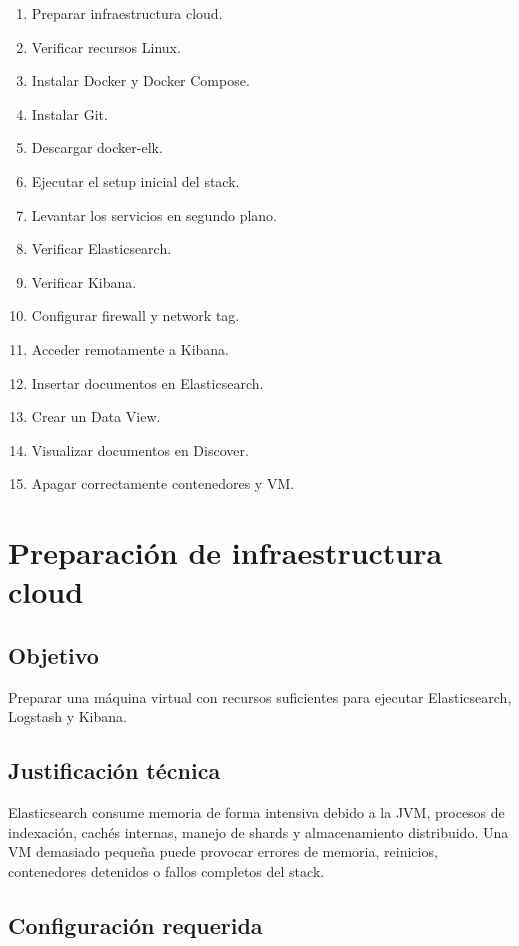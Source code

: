 \documentclass[
  coursetitle={Cómputo Nube y Tecnologías Emergentes},
  coursehours={96},
  coursedate={Verano 2026},
  doctype={Laboratorio},
  otherlangs={english,french},
  authorname={Lázaro},
  authorsurname={Bustio-Martínez},
  authortitle={PhD},
  role={Profesor Investigador},
  email={lbustio@inaoe.mx},
  phone={5559504000},
  ext={7459},
  institution={Instituto Nacional de Astrofísica, Óptica y Electrónica (INAOE)},
  department={Maestría en Ciencias en Tecnologías de Seguridad},
  address={Luis Enrique Erro 1, Sta. Ma. Tonantzintla, San Andrés Cholula, CP 72840, Puebla, México},
  margin={0.5in}
]{../../lbustio_lecture_notes}
\begin{document}
\begin{enumerate}
    \item Preparar infraestructura cloud.
    \item Verificar recursos Linux.
    \item Instalar Docker y Docker Compose.
    \item Instalar Git.
    \item Descargar docker-elk.
    \item Ejecutar el setup inicial del stack.
    \item Levantar los servicios en segundo plano.
    \item Verificar Elasticsearch.
    \item Verificar Kibana.
    \item Configurar firewall y network tag.
    \item Acceder remotamente a Kibana.
    \item Insertar documentos en Elasticsearch.
    \item Crear un Data View.
    \item Visualizar documentos en Discover.
    \item Apagar correctamente contenedores y VM.
\end{enumerate}

\section{Preparación de infraestructura cloud}

\subsection{Objetivo}

Preparar una máquina virtual con recursos suficientes para ejecutar Elasticsearch, Logstash y Kibana.

\subsection{Justificación técnica}

Elasticsearch consume memoria de forma intensiva debido a la JVM, procesos de indexación, cachés internas, manejo de shards y almacenamiento distribuido. Una VM demasiado pequeña puede provocar errores de memoria, reinicios, contenedores detenidos o fallos completos del stack.

\subsection{Configuración requerida}
\end{document}
